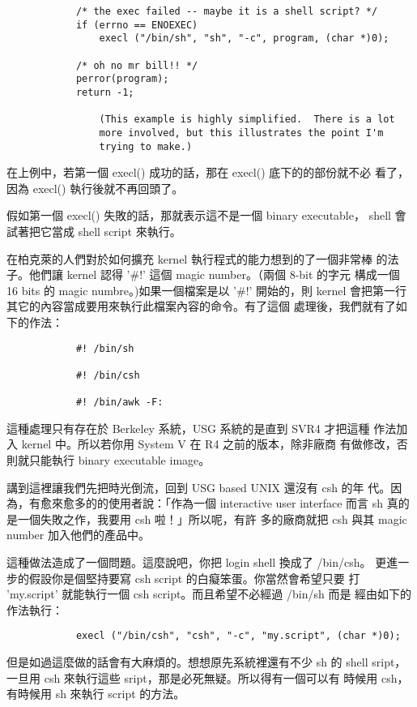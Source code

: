 \documentclass{article}
\begin{document}
\begin{CJK*}{Bg5}{ming}
\begin{verbatim}
	        /* the exec failed -- maybe it is a shell script? */
	        if (errno == ENOEXEC)
	            execl ("/bin/sh", "sh", "-c", program, (char *)0);

	        /* oh no mr bill!! */
	        perror(program);
	        return -1;

	            (This example is highly simplified.  There is a lot
	            more involved, but this illustrates the point I'm
	            trying to make.)
\end{verbatim}
	在上例中，若第一個 execl() 成功的話，那在 execl() 底下的的部份就不必
	看了，因為 execl() 執行後就不再回頭了。

	假如第一個 execl() 失敗的話，那就表示這不是一個 binary executable，
	shell 會試著把它當成 shell script 來執行。

	在柏克萊的人們對於如何擴充 kernel 執行程式的能力想到的了一個非常棒
	的法子。他們讓 kernel 認得 '\#!' 這個 magic number。（兩個 8-bit 的字元
	構成一個 16 bits 的 magic numbre。)如果一個檔案是以 '\#!' 開始的，則 
	kernel 會把第一行其它的內容當成要用來執行此檔案內容的命令。有了這個
	處理後，我們就有了如下的作法：
\begin{verbatim}
	        #! /bin/sh

	        #! /bin/csh

	        #! /bin/awk -F:
\end{verbatim}
	這種處理只有存在於 Berkeley 系統，USG 系統的是直到 SVR4 才把這種
	作法加入 kernel 中。所以若你用 System V 在 R4 之前的版本，除非廠商
	有做修改，否則就只能執行 binary executable image。

	講到這裡讓我們先把時光倒流，回到 USG based UNIX 還沒有 csh 的年
	代。因為，有愈來愈多的的使用者說：「作為一個 interactive user 
        interface 而言 sh 真的是一個失敗之作，我要用 csh 啦！」所以呢，有許
        多的廠商就把 csh 與其 magic number 加入他們的產品中。

	這種做法造成了一個問題。這麼說吧，你把 login shell 換成了 /bin/csh。
        更進一步的假設你是個堅持要寫 csh script 的白癡笨蛋。你當然會希望只要
        打 'my.script' 就能執行一個 csh script。而且希望不必經過 /bin/sh 而是
        經由如下的作法執行：
\begin{verbatim}
	        execl ("/bin/csh", "csh", "-c", "my.script", (char *)0);
\end{verbatim}

	但是如過這麼做的話會有大麻煩的。想想原先系統裡還有不少 sh 的 shell 
	sript，一旦用 csh 來執行這些 sript，那是必死無疑。所以得有一個可以有
	時候用 csh，有時候用 sh 來執行 script 的方法。


\end{CJK*}
\end{document}
